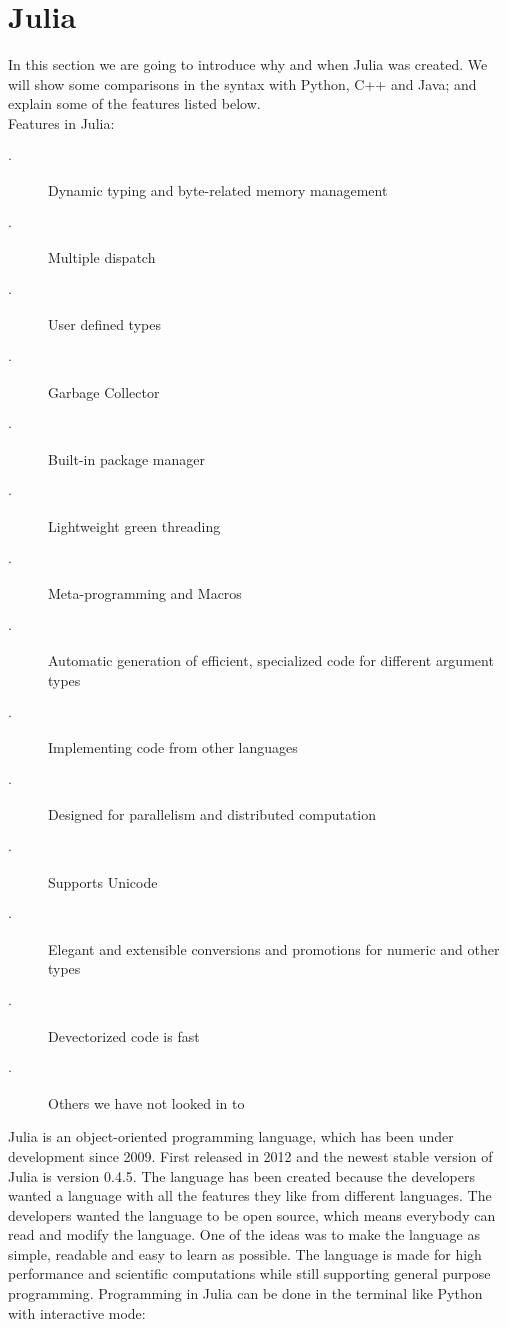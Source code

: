 \documentclass[a4paper, 11pt, titlepage]{article}
\begin{document}
\section{Julia}
In this section we are going to introduce why and when Julia was created. We will show some comparisons in the syntax with Python, C++ and Java; and explain some of the features listed below.\\
Features in Julia:
\begin{description}
	\item[$\cdot$] Dynamic typing and byte-related memory management
	\item[$\cdot$] Multiple dispatch
	\item[$\cdot$] User defined types
	\item[$\cdot$] Garbage Collector
	\item[$\cdot$] Built-in package manager
	\item[$\cdot$] Lightweight green threading
	\item[$\cdot$] Meta-programming and Macros
	\item[$\cdot$] Automatic generation of efficient, specialized code for different argument types
	\item[$\cdot$] Implementing code from other languages
	\item[$\cdot$] Designed for parallelism and distributed computation
	\item[$\cdot$] Supports Unicode
	\item[$\cdot$] Elegant and extensible conversions and promotions for numeric and other types
	\item[$\cdot$] Devectorized code is fast
	\item[$\cdot$] Others we have not looked in to
\end{description}
Julia is an object-oriented programming language, which has been under development since 2009. First released in 2012 and the newest stable version of Julia is version 0.4.5. The language has been created because the developers wanted a language with all the features they like from different languages. The developers wanted the language to be open source, which means everybody can read and modify the language. One of the ideas was to make the language as simple, readable and easy to learn as possible. The language is made for high performance and scientific computations while still supporting general purpose programming. 
Programming in Julia can be done in the terminal like Python with interactive mode:
\end{document}
